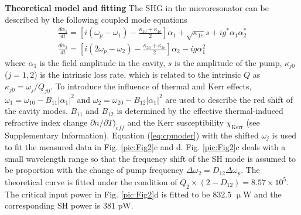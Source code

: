 \documentclass[a4paper,8pt,hyperref, twocolumn]{article}
\begin{document}
\textbf{Theoretical model and fitting}
The SHG in the microresonator can be described by the following coupled mode equations
\begin{gather}
\frac{d{\alpha}_1}{dt} = [i(\omega_p-\omega_1)-\frac{\kappa_{10}+\kappa_{1e}}{2}]{\alpha}_1+\sqrt{\kappa_{1e}}s+ig^*{\alpha}_1{\alpha}_2^* \\
\frac{d{\alpha}_2}{dt} = [i(2\omega_p-\omega_2)-\frac{\kappa_{20}+\kappa_{2e}}{2}]{\alpha}_2-ig{\alpha}_1^2
\label{eq:cpmoder}
\end{gather}
where ${\alpha}_1$ is the field amplitude in the cavity, $s$ is the amplitude of the pump, $\kappa_{j0}$ ($j = 1,2$) is the intrinsic loss rate, which is related to the intrinsic $Q$ as $\kappa_{j0} = \omega_{j}/Q_{j0}$. 
To introduce the influence of thermal and Kerr effects, $\omega_1 =\omega_{10} -B_{11}|\alpha_1|^2$ and $\omega_2 =\omega_{20} -B_{12}|\alpha_1|^2$ are used to describe the red shift of the cavity modes.
$B_{11}$ and $B_{12}$ is determined by the effective thermal-induced refractive index change ${\partial n}/{\partial T})_{eff}$ and the Kerr susceptibility $\chi_{\mathrm{Kerr}}$ (see Supplementary Information).
Equation (\ref{eq:cpmoder}) with the shifted $\omega_j$ is used to fit the measured data in Fig. \ref{pic:Fig2}c and d.
Fig. \ref{pic:Fig2}c deals with a small wavelength range so that the frequency shift of the SH mode is assumed to be proportion with the change of pump frequency $\Delta \omega_2 = D_{12}\Delta \omega_p$.
The theoretical curve is fitted under the condition of $Q_2\times(2-D_{12})=8.57\times 10^5$.
The critical input power in Fig. \ref{pic:Fig2}d is fitted to be $832.5$ $\upmu$W and the corresponding SH power is $381$ pW.





\end{document}

